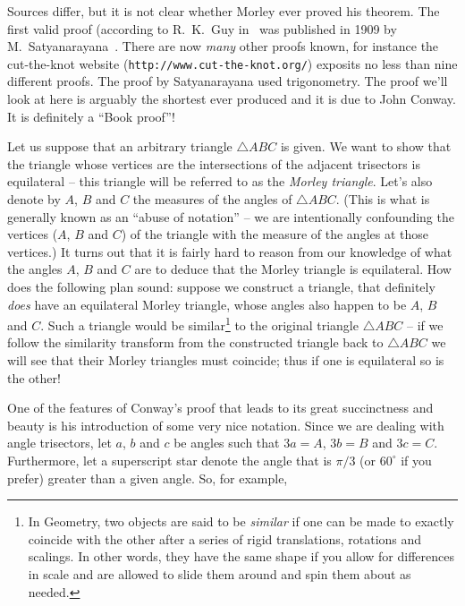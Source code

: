  
Sources differ, but it is not clear whether Morley ever proved his 
theorem.  The first valid proof (according to R.\ K.\ Guy in~\cite{lighthouse}
was published in 1909 by M.\ Satyanarayana~\cite{satyana}.  There are now
\emph{many} other proofs known, for instance the cut-the-knot website
(\verb+http://www.cut-the-knot.org/+) exposits no less than nine different
proofs.  The proof by Satyanarayana used trigonometry.  The proof we'll
look at here is arguably the shortest ever produced and it is due to
John Conway.  It is definitely a ``Book proof''!

Let us suppose that an arbitrary triangle ${\triangle}ABC$ is given.
We want to show that the triangle whose vertices are the intersections
of the adjacent trisectors is equilateral -- this triangle will be
referred to as the \emph{Morley triangle}.  
Let's also denote by
$A$, $B$ and $C$ the measures of the angles of ${\triangle}ABC$.  (This
is what is generally known as an ``abuse of notation'' -- we are intentionally
confounding the vertices ($A$, $B$ and $C$) of the triangle with the
measure of the angles at those vertices.)   It turns out that it is
fairly hard to reason from our knowledge of what the angles $A$, $B$ and $C$
are to deduce that the Morley triangle is equilateral.  How does the
following plan sound: suppose we construct a triangle, that definitely
\emph{does} have an equilateral Morley triangle, whose angles also happen
to be $A$, $B$ and $C$.  Such a triangle would be 
similar\footnote{In Geometry, two objects are said to be \emph{similar} %
if one can be made to exactly coincide with the other after a series of %
rigid translations, rotations and scalings.  In other words, they have %
the same shape if you allow for differences in scale and are allowed to %
slide them around and spin them about as needed.} 
to the original
triangle ${\triangle}ABC$ -- if we follow the 
similarity transform from the
constructed triangle back to ${\triangle}ABC$ we will see that their 
Morley triangles must coincide; thus if one is equilateral so is the other!

One of the features of Conway's proof that leads to its great succinctness
and beauty is his introduction of some very nice notation.  
Since we are dealing with angle trisectors, let $a$, $b$ and $c$ be 
angles such that $3a=A$, $3b=B$ and $3c=C$.  Furthermore, let a superscript
star denote the angle that is $\pi/3$ (or $60^\circ$ if you prefer) greater
than a given angle.  So, for example, 

